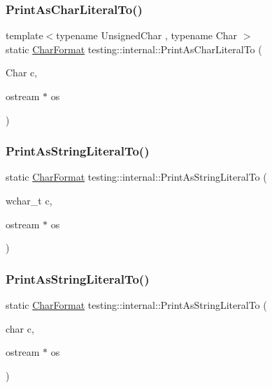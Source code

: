 \subsubsection{\texorpdfstring{PrintAsCharLiteralTo()}{PrintAsCharLiteralTo()}}
{\footnotesize\ttfamily template$<$typename Unsigned\+Char , typename Char $>$ \\
static \mbox{\hyperlink{namespacetesting_1_1internal_ae2ef98247c76a50cdc80ceb4a6c81793}{Char\+Format}} testing\+::internal\+::\+Print\+As\+Char\+Literal\+To (\begin{DoxyParamCaption}\item[{Char}]{c,  }\item[{ostream $\ast$}]{os }\end{DoxyParamCaption})\hspace{0.3cm}{\ttfamily [static]}}

\mbox{\label{namespacetesting_1_1internal_a8c5838995d7bb9e4232b69e6bcdb9ab8}} 
\subsubsection{\texorpdfstring{PrintAsStringLiteralTo()}{PrintAsStringLiteralTo()}\hspace{0.1cm}{\footnotesize\ttfamily [1/2]}}
{\footnotesize\ttfamily static \mbox{\hyperlink{namespacetesting_1_1internal_ae2ef98247c76a50cdc80ceb4a6c81793}{Char\+Format}} testing\+::internal\+::\+Print\+As\+String\+Literal\+To (\begin{DoxyParamCaption}\item[{wchar\+\_\+t}]{c,  }\item[{ostream $\ast$}]{os }\end{DoxyParamCaption})\hspace{0.3cm}{\ttfamily [static]}}

\mbox{\label{namespacetesting_1_1internal_a82e5b3cf45fd9c4603dbe14bc4cb38c2}} 
\subsubsection{\texorpdfstring{PrintAsStringLiteralTo()}{PrintAsStringLiteralTo()}\hspace{0.1cm}{\footnotesize\ttfamily [2/2]}}
{\footnotesize\ttfamily static \mbox{\hyperlink{namespacetesting_1_1internal_ae2ef98247c76a50cdc80ceb4a6c81793}{Char\+Format}} testing\+::internal\+::\+Print\+As\+String\+Literal\+To (\begin{DoxyParamCaption}\item[{char}]{c,  }\item[{ostream $\ast$}]{os }\end{DoxyParamCaption})\hspace{0.3cm}{\ttfamily [static]}}

